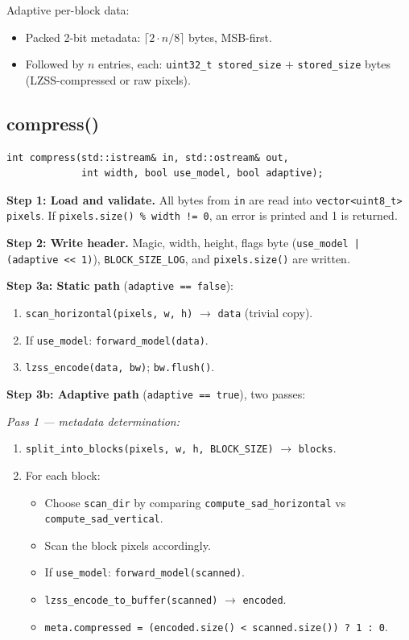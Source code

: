 Adaptive per-block data:
\begin{itemize}
  \item Packed 2-bit metadata: $\lceil 2 \cdot n / 8 \rceil$ bytes, MSB-first.
  \item Followed by $n$ entries, each: \texttt{uint32\_t stored\_size} $+$
        \texttt{stored\_size} bytes (LZSS-compressed or raw pixels).
\end{itemize}

\subsection{compress()}
\label{sec:codec-compress}

\begin{lstlisting}[style=cpp]
int compress(std::istream& in, std::ostream& out,
             int width, bool use_model, bool adaptive);
\end{lstlisting}

\textbf{Step 1: Load and validate.}
All bytes from \texttt{in} are read into \texttt{vector\textless uint8\_t\textgreater{} pixels}.
If \texttt{pixels.size() \% width != 0}, an error is printed and 1 is returned.

\textbf{Step 2: Write header.}
Magic, width, height, flags byte (\texttt{use\_model | (adaptive << 1)}),
\texttt{BLOCK\_SIZE\_LOG}, and \texttt{pixels.size()} are written.

\textbf{Step 3a: Static path} (\texttt{adaptive == false}):
\begin{enumerate}
  \item \texttt{scan\_horizontal(pixels, w, h)} $\to$ \texttt{data} (trivial copy).
  \item If \texttt{use\_model}: \texttt{forward\_model(data)}.
  \item \texttt{lzss\_encode(data, bw)}; \texttt{bw.flush()}.
\end{enumerate}

\textbf{Step 3b: Adaptive path} (\texttt{adaptive == true}), two passes:

\emph{Pass 1 --- metadata determination:}
\begin{enumerate}
  \item \texttt{split\_into\_blocks(pixels, w, h, BLOCK\_SIZE)} $\to$ \texttt{blocks}.
  \item For each block:
    \begin{itemize}
      \item Choose \texttt{scan\_dir} by comparing
            \texttt{compute\_sad\_horizontal} vs \texttt{compute\_sad\_vertical}.
      \item Scan the block pixels accordingly.
      \item If \texttt{use\_model}: \texttt{forward\_model(scanned)}.
      \item \texttt{lzss\_encode\_to\_buffer(scanned)} $\to$ \texttt{encoded}.
      \item \texttt{meta.compressed = (encoded.size() < scanned.size()) ? 1 : 0}.
    \end{itemize}
\end{enumerate}

